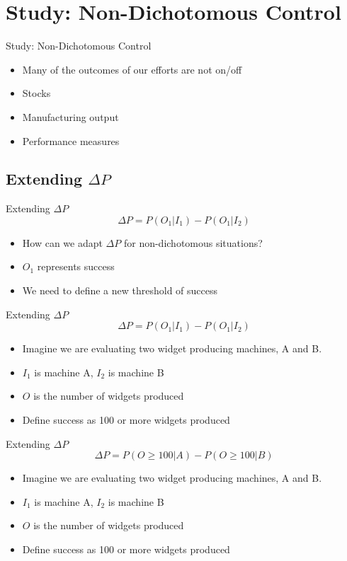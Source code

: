 \documentclass{beamer}
\newcommand{\deltap}{$\Delta P$}
\begin{document}
\section{Study: Non-Dichotomous Control}
\begin{frame}{Study: Non-Dichotomous Control}
	\begin{itemize}
		\item Many of the outcomes of our efforts are not on/off
		\pause
		\item Stocks
		\pause
		\item Manufacturing output
		\pause
		\item Performance measures
	\end{itemize}
\end{frame}

\subsection*{Extending \deltap}
\begin{frame}{Extending \deltap}
	\begin{equation*}
		\Delta P = P(O_1|I_1) - P(O_1|I_2)
	\end{equation*}
	\begin{itemize}
		\item How can we adapt \deltap \xspace for non-dichotomous situations?
		\item $O_1$ represents success
		\item We need to define a new threshold of success
	\end{itemize}
\end{frame}

\begin{frame}{Extending \deltap}
	\begin{equation*}
		\Delta P = P(O_1|I_1) - P(O_1|I_2)
	\end{equation*}
	\begin{itemize}
		\item Imagine we are evaluating two widget producing machines, A and B.
		\item $I_1$ is machine A, $I_2$ is machine B
		\item $O$ is the number of widgets produced
		\item Define success as 100 or more widgets produced
	\end{itemize}
\end{frame}

\begin{frame}{Extending \deltap}
	\begin{displaymath}
	\Delta P = P(O \ge 100|A) - P(O \ge 100|B)
	\end{displaymath}
	\begin{itemize}
		\item Imagine we are evaluating two widget producing machines, A and B.
		\item $I_1$ is machine A, $I_2$ is machine B
		\item $O$ is the number of widgets produced
		\item Define success as 100 or more widgets produced
	\end{itemize}
\end{frame}
\end{document}
